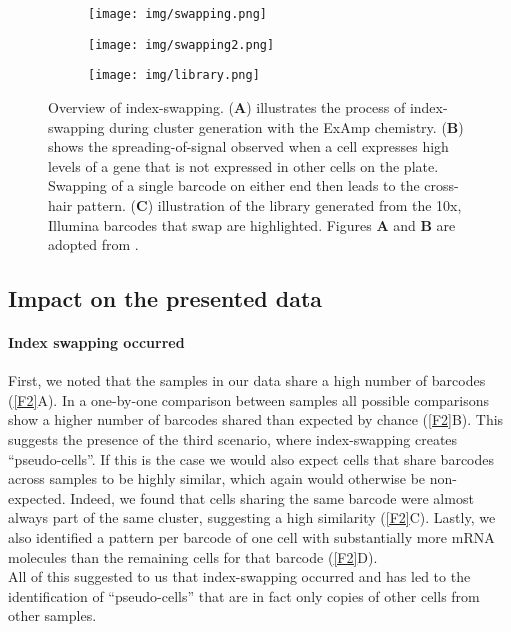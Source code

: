\documentclass{article}
\begin{document}
\begin{figure}
    \begin{subfigure}[c]{0.5\textwidth}
	\texttt{[image: img/swapping.png]}
    \caption{}
    \end{subfigure}
    \begin{subfigure}[c]{0.5\textwidth}
	\texttt{[image: img/swapping2.png]}
    \caption{}
    \end{subfigure}
    \begin{subfigure}[c]{0.5\textwidth}
	\texttt{[image: img/library.png]}
    \caption{}
    \end{subfigure}
    \caption{Overview of index-swapping.
	(\textbf{A}) illustrates the process of index-swapping during cluster generation with the ExAmp chemistry.
	(\textbf{B}) shows the spreading-of-signal observed when a cell expresses high levels of a gene that is not expressed in other cells on the plate.
	Swapping of a single barcode on either end then leads to the cross-hair pattern.
	(\textbf{C}) illustration of the library generated from the 10x, Illumina barcodes that swap are highlighted. 
	Figures \textbf{A} and \textbf{B} are adopted from \autocite{Sinha2017}.
    }
    \label{F1}
\end{figure}

\subsection*{Impact on the presented data}
\paragraph{Index swapping occurred}
First, we noted that the samples in our data share a high number of barcodes (\autoref{F2}A).
In a one-by-one comparison between samples all possible comparisons show a higher number of barcodes shared than expected by chance (\autoref{F2}B).
This suggests the presence of the third scenario, where index-swapping creates ``pseudo-cells''.
If this is the case we would also expect cells that share barcodes across samples to be highly similar, which again would otherwise be non-expected.
Indeed, we found that cells sharing the same barcode were almost always part of the same cluster, suggesting a high similarity (\autoref{F2}C).
Lastly, we also identified a pattern per barcode of one cell with substantially more mRNA molecules than the remaining cells for that barcode (\autoref{F2}D). \\
All of this suggested to us that index-swapping occurred and has led to the identification of ``pseudo-cells'' that are in fact only copies of other cells from other samples.\\
\end{document}
